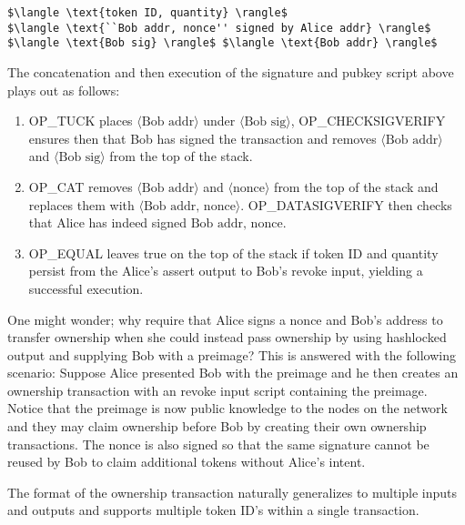 \documentclass[9pt,oneside]{amsart}
\begin{document}
\begin{lstlisting}[title={\textbf{Bob's Revoke Signature Script}}]
$\langle \text{token ID, quantity} \rangle$ 
$\langle \text{``Bob addr, nonce'' signed by Alice addr} \rangle$ $\langle \text{Bob sig} \rangle$ $\langle \text{Bob addr} \rangle$ 
\end{lstlisting}

The concatenation and then execution of the signature and pubkey script above plays out as follows:
\begin{enumerate}
    \item OP\_TUCK places $\langle \text{Bob addr} \rangle$ under $\langle \text{Bob sig} \rangle$, OP\_CHECKSIGVERIFY ensures then that Bob has signed the transaction and removes $\langle \text{Bob addr} \rangle$ and $\langle \text{Bob sig} \rangle$ from the top of the stack.
    \item OP\_CAT removes $\langle \text{Bob addr} \rangle$ and $\langle \text{nonce} \rangle$ from the top of the stack and replaces them with $\langle \text{Bob addr, nonce} \rangle$. OP\_DATASIGVERIFY then checks that Alice has indeed signed $\text{Bob addr, nonce}$.
    \item OP\_EQUAL leaves true on the top of the stack if token ID and quantity persist from the Alice's assert output to Bob's revoke input, yielding a successful execution.
\end{enumerate}


One might wonder; why require that Alice signs a nonce and Bob's address to transfer ownership when she could instead pass ownership by using hashlocked output and supplying Bob with a preimage? This is answered with the following scenario: Suppose Alice presented Bob with the preimage and he then creates an ownership transaction with an revoke input script containing the preimage. Notice that the preimage is now public knowledge to the nodes on the network and they may claim ownership before Bob by creating their own ownership transactions. The nonce is also signed so that the same signature cannot be reused by Bob to claim additional tokens without Alice's intent.

The format of the ownership transaction naturally generalizes to multiple inputs and outputs and supports multiple token ID's within a single transaction.
\end{document}
